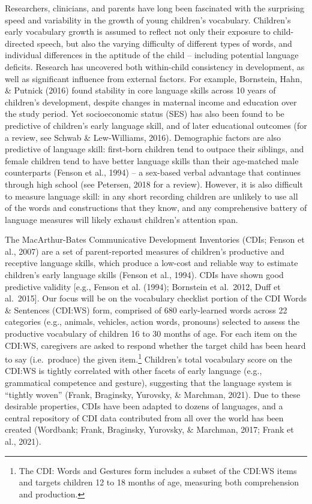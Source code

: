 \documentclass[10pt, letterpaper]{article}
\begin{document}
Researchers, clinicians, and parents have long been fascinated with the
surprising speed and variability in the growth of young children's
vocabulary. Children's early vocabulary growth is assumed to reflect not
only their exposure to child-directed speech, but also the varying
difficulty of different types of words, and individual differences in
the aptitude of the child -- including potential language deficits.
Research has uncovered both within-child consistency in development, as
well as significant influence from external factors. For example,
Bornstein, Hahn, \& Putnick (2016) found stability in core language
skills across 10 years of children's development, despite changes in
maternal income and education over the study period. Yet socioeconomic
status (SES) has also been found to be predictive of children's early
language skill, and of later educational outcomes (for a review, see
Schwab \& Lew-Williams, 2016). Demographic factors are also predictive
of language skill: first-born children tend to outpace their siblings,
and female children tend to have better language skills than their
age-matched male counterparts (Fenson et al., 1994) -- a sex-based
verbal advantage that continues through high school (see Petersen, 2018
for a review). However, it is also difficult to measure language skill:
in any short recording children are unlikely to use all of the words and
constructions that they know, and any comprehensive battery of language
measures will likely exhaust children's attention span.

The MacArthur-Bates Communicative Development Inventories (CDIs; Fenson
et al., 2007) are a set of parent-reported measures of children's
productive and receptive language skills, which produce a low-cost and
reliable way to estimate children's early language skills (Fenson et
al., 1994). CDIs have shown good predictive validity {[}e.g., Fenson et
al. (1994); Bornstein et al.~2012, Duff et al.~2015{]}. Our focus will
be on the vocabulary checklist portion of the CDI Words \& Sentences
(CDI:WS) form, comprised of 680 early-learned words across 22 categories
(e.g., animals, vehicles, action words, pronouns) selected to assess the
productive vocabulary of children 16 to 30 months of age. For each item
on the CDI:WS, caregivers are asked to respond whether the target child
has been heard to say (i.e.~produce) the given item.\footnote{The CDI:
  Words and Gestures form includes a subset of the CDI:WS items and
  targets children 12 to 18 months of age, measuring both comprehension
  and production.} Children's total vocabulary score on the CDI:WS is
tightly correlated with other facets of early language (e.g.,
grammatical competence and gesture), suggesting that the language system
is ``tightly woven'' (Frank, Braginsky, Yurovsky, \& Marchman, 2021).
Due to these desirable properties, CDIs have been adapted to dozens of
languages, and a central repository of CDI data contributed from all
over the world has been created (Wordbank; Frank, Braginsky, Yurovsky,
\& Marchman, 2017; Frank et al., 2021).
\end{document}
